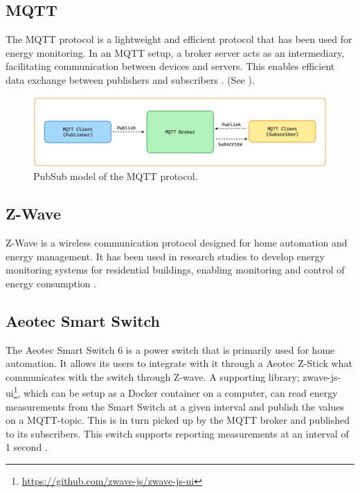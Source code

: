 \documentclass[
  table]{report}
\begin{document}
\subsection{MQTT}

The \ac{MQTT} protocol is a lightweight and efficient protocol that has
been used for energy monitoring. In an \ac{MQTT} setup, a broker server
acts as an intermediary, facilitating communication between devices and
servers. This enables efficient data exchange between publishers and
subscribers \citep{al-fuqahaInternetThingsSurvey2015}. (See
).

\begin{figure}[H]
\centering
  \includegraphics{assets/3-mqtt-pubsub.png}
  \caption{PubSub model of the \ac{MQTT} protocol.}
  \label{fig:mqtt-model.png}
\end{figure}

\subsection{Z-Wave}

Z-Wave is a wireless communication protocol designed for home automation
and energy management. It has been used in research studies to develop
energy monitoring systems for residential buildings, enabling monitoring
and control of energy consumption
\citep{al-fuqahaInternetThingsSurvey2015}.

\subsection{Aeotec Smart Switch}

The Aeotec Smart Switch 6 is a power switch that is primarily used for
home automation. It allows its users to integrate with it through a
Aeotec Z-Stick what communicates with the switch through Z-wave. A
supporting library; zwave-js-ui\footnote{\url{https://github.com/zwave-js/zwave-js-ui}},
which can be setup as a Docker container on a computer, can read energy
measurements from the Smart Switch at a given interval and publish the
values on a \ac{MQTT}-topic. This is in turn picked up by the \ac{MQTT}
broker and published to its subscribers. This switch supports reporting
measurements at an interval of 1 second \citep{aeotecAeotecSmartSwitch}.
\end{document}

